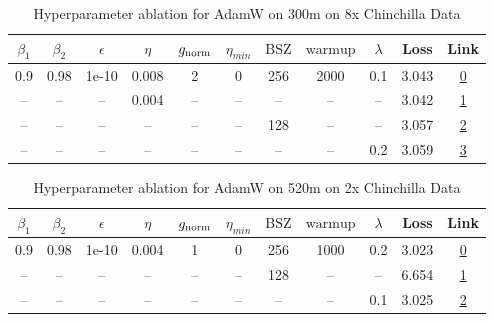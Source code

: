 \begin{table}[H]
\centering
\caption{Hyperparameter ablation for AdamW on 300m on 8x Chinchilla Data}
\label{tab:ablation_adamw_300m_on_8x_chinchilla_data}
\begin{tabular}{ccccccccccc}
\toprule
$\beta_1$ & $\beta_2$ & $\epsilon$ & $\eta$ & $g_{\mathrm{norm}}$ & $\eta_{min}$ & $\mathrm{BSZ}$ & $\mathrm{warmup}$ & $\lambda$ & Loss & Link \\
\midrule
0.9 & 0.98 & 1e-10 & 0.008 & 2 & 0 & 256 & 2000 & 0.1 & 3.043 & \href{https://wandb.ai/marin-community/optimizer-scaling/runs/sweep-300m-48B-adamw07fc6elr0.008-wd0.1-minlr0-warmup2000-b10.9--b38246}{0} \\
\midrule
-- & -- & -- & 0.004 & -- & -- & -- & -- & -- & 3.042 & \href{https://wandb.ai/marin-community/optimizer-scaling/runs/sweep-300m-48B-adamw2537edlr0.004-wd0.1-minlr0-warmup2000-b10.9--a59fd5}{1} \\
-- & -- & -- & -- & -- & -- & 128 & -- & -- & 3.057 & \href{https://wandb.ai/marin-community/optimizer-scaling/runs/sweep-300m-48B-adamw6a50aflr0.008-wd0.1-minlr0-warmup2000-b10.9--22e2a7}{2} \\
-- & -- & -- & -- & -- & -- & -- & -- & 0.2 & 3.059 & \href{https://wandb.ai/marin-community/optimizer-scaling/runs/sweep-300m-48B-adamw7d9e60lr0.008-wd0.2-minlr0-warmup2000-b10.9--dfe5c9}{3} \\
\bottomrule
\end{tabular}
\end{table}

\begin{table}[H]
\centering
\caption{Hyperparameter ablation for AdamW on 520m on 2x Chinchilla Data}
\label{tab:ablation_adamw_520m_on_2x_chinchilla_data}
\begin{tabular}{ccccccccccc}
\toprule
$\beta_1$ & $\beta_2$ & $\epsilon$ & $\eta$ & $g_{\mathrm{norm}}$ & $\eta_{min}$ & $\mathrm{BSZ}$ & $\mathrm{warmup}$ & $\lambda$ & Loss & Link \\
\midrule
0.9 & 0.98 & 1e-10 & 0.004 & 1 & 0 & 256 & 1000 & 0.2 & 3.023 & \href{https://wandb.ai/marin-community/optimizer-scaling/runs/sweep-520m-21B-adamws9d215dlr0.004-wd0.2-minlr0-warmup1000-b10.9-d16851}{0} \\
\midrule
-- & -- & -- & -- & -- & -- & 128 & -- & -- & 6.654 & \href{https://wandb.ai/marin-community/optimizer-scaling/runs/sweep-520m-21B-adamwsffc6bdlr0.004-wd0.2-minlr0-warmup1000-b10.9-646b5d}{1} \\
-- & -- & -- & -- & -- & -- & -- & -- & 0.1 & 3.025 & \href{https://wandb.ai/marin-community/optimizer-scaling/runs/sweep-520m-21B-adamws529f50lr0.004-wd0.1-minlr0-warmup1000-b10.9-c43fcb}{2} \\
\bottomrule
\end{tabular}
\end{table}

